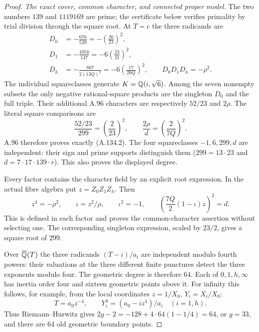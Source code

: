 \begin{proof}
\emph{The exact cover, common character, and connected proper model.}
The two numbers $139$ and $1119169$ are prime;
the certificate below verifies primality by trial
division through the square root.
At $T=c$ the three radicands are
\[
 \begin{aligned}
 D_0&=-\frac{676}{529}
           =-\left(\frac{26}{23}\right)^2,\\
 D_1&=-\frac{1058}{147}
           =-6\left(\frac{23}{21}\right)^2,\\
 D_h&=-\frac{867}{2(13Q)^2}
           =-6\left(\frac{17}{26Q}\right)^2,\qquad
                  D_0D_1D_h=-\rho^2.
 \end{aligned}
\tag{A.134.6}
\]
The individual squareclasses generate $K=\mathbb Q(i,\sqrt6)$.
Among the seven nonempty subsets the only negative
rational-square products are the singleton $D_0$
and the full triple.
Their additional A.96 characters are respectively
$52/23$ and $2\rho$.
The literal square comparisons are
\[
             \frac{52/23}{299}=\left(\frac2{23}\right)^2,
          \qquad \frac{2\rho}{d}=\left(\frac2{7Q}\right)^2.
\tag{A.134.7}
\]
A.96 therefore proves exactly (A.134.2).
The four squareclasses $-1,6,299,d$ are independent:
their sign and prime supports distinguish them
($299=13\cdot23$ and $d=7\cdot17\cdot139\cdot r$).
This also proves the displayed degree.

Every factor contains the character field by an
explicit root expression.
In the actual fibre algebra put $z=Z_0Z_1Z_h$.
Then
\[
       z^4=-\rho^2,\qquad
       \iota=z^2/\rho,\qquad \iota^2=-1,\qquad
       \left(\frac{7Q}{2}(1-\iota)z\right)^2=d.
\tag{A.134.8}
\]
This is defined in each factor and proves the
common-character assertion without selecting one.
The corresponding singleton expression, scaled
by $23/2$, gives a square root of $299$.

Over $\overline{\mathbb Q}(T)$ the three radicands
$(T-i)/a_i$ are independent modulo fourth powers:
their valuations at the three different finite
punctures detect the three exponents modulo four.
The geometric degree is therefore $64$.
Each of $0,1,h,\infty$ has inertia order four and
sixteen geometric points above it.
For infinity this follows, for example, from the
local coordinates $z=1/X_0$, $Y_i=X_i/X_0$:
\[
       T=a_0z^{-4},\qquad
                 Y_i^4=(a_0-i z^4)/a_i\quad(i=1,h).
\tag{A.134.9}
\]
Thus Riemann--Hurwitz gives
$2g-2=-128+4\cdot64(1-1/4)=64$, or $g=33$,
and there are $64$ old geometric boundary points.


\end{proof}
